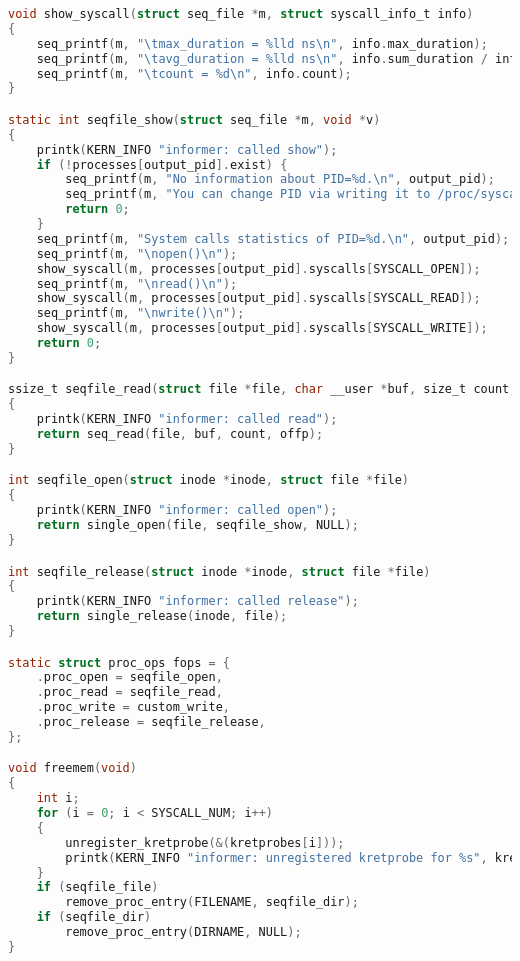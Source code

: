 \begin{appendices}
\begin{lstlisting}[language=C, label=lst:full_code, caption={Код модуля ядра для мониторинга системных вызовов open, read, close}]
void show_syscall(struct seq_file *m, struct syscall_info_t info)
{
    seq_printf(m, "\tmax_duration = %lld ns\n", info.max_duration);
    seq_printf(m, "\tavg_duration = %lld ns\n", info.sum_duration / info.count);
    seq_printf(m, "\tcount = %d\n", info.count);
}

static int seqfile_show(struct seq_file *m, void *v)
{
    printk(KERN_INFO "informer: called show");
    if (!processes[output_pid].exist) {
        seq_printf(m, "No information about PID=%d.\n", output_pid);
        seq_printf(m, "You can change PID via writing it to /proc/syscalls file.\n");
        return 0;
    }
    seq_printf(m, "System calls statistics of PID=%d.\n", output_pid);
    seq_printf(m, "\nopen()\n");
    show_syscall(m, processes[output_pid].syscalls[SYSCALL_OPEN]);
    seq_printf(m, "\nread()\n");
    show_syscall(m, processes[output_pid].syscalls[SYSCALL_READ]);
    seq_printf(m, "\nwrite()\n");
    show_syscall(m, processes[output_pid].syscalls[SYSCALL_WRITE]);
    return 0;
}

ssize_t seqfile_read(struct file *file, char __user *buf, size_t count, loff_t *offp)
{
    printk(KERN_INFO "informer: called read");
    return seq_read(file, buf, count, offp);
}

int seqfile_open(struct inode *inode, struct file *file)
{
    printk(KERN_INFO "informer: called open");
    return single_open(file, seqfile_show, NULL);
}

int seqfile_release(struct inode *inode, struct file *file)
{
    printk(KERN_INFO "informer: called release");
    return single_release(inode, file);
}

static struct proc_ops fops = {
    .proc_open = seqfile_open,
    .proc_read = seqfile_read,
    .proc_write = custom_write,
    .proc_release = seqfile_release,
};

void freemem(void)
{
    int i;
    for (i = 0; i < SYSCALL_NUM; i++)
    {
        unregister_kretprobe(&(kretprobes[i]));
        printk(KERN_INFO "informer: unregistered kretprobe for %s", kretprobes[i].kp.symbol_name);
    }
    if (seqfile_file)
        remove_proc_entry(FILENAME, seqfile_dir);
    if (seqfile_dir)
        remove_proc_entry(DIRNAME, NULL);
}


\end{lstlisting}
\end{appendices}
